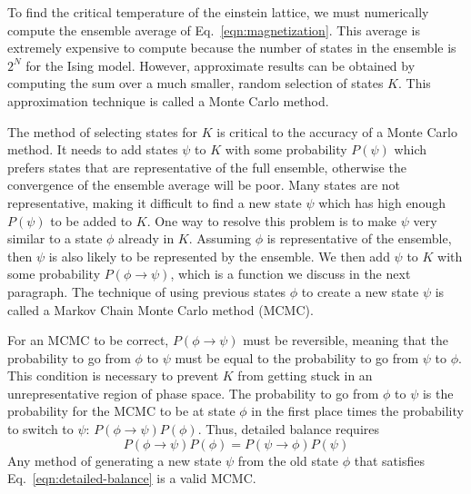 \documentclass[amsmath,amssymb,aps,twocolumn,nofootinbib]{revtex4-2}
\begin{document}
To find the critical temperature of the einstein lattice, we must numerically compute the ensemble average of Eq.~\ref{eqn:magnetization}. This average is extremely expensive to compute because the number of states in the ensemble is $2^N$ for the Ising model. However, approximate results can be obtained by computing the sum over a much smaller, random selection of states $K$. This approximation technique is called a Monte Carlo method.

The method of selecting states for $K$ is critical to the accuracy of a Monte Carlo method. It needs to add states $\psi$ to $K$ with some probability $P(\psi)$ which prefers states that are representative of the full ensemble, otherwise the convergence of the ensemble average will be poor. Many states are not representative, making it difficult to find a new state $\psi$ which has high enough $P(\psi)$ to be added to $K$. One way to resolve this problem is to make $\psi$ very similar to a state $\phi$ already in $K$. Assuming $\phi$ is representative of the ensemble, then $\psi$ is also likely to be represented by the ensemble. We then add $\psi$ to $K$ with some probability $P(\phi \rightarrow \psi)$, which is a function we discuss in the next paragraph. The technique of using previous states $\phi$ to create a new state $\psi$ is called a Markov Chain Monte Carlo method (MCMC).

For an MCMC to be correct, $P(\phi \rightarrow \psi)$ must be reversible, meaning that the probability to go from $\phi$ to $\psi$ must be equal to the probability to go from $\psi$ to $\phi$. This condition is necessary to prevent $K$ from getting stuck in an unrepresentative region of phase space. The probability to go from $\phi$ to $\psi$ is the probability for the MCMC to be at state $\phi$ in the first place times the probability to switch to $\psi$: $P(\phi \rightarrow \psi)P(\phi)$. Thus, detailed balance requires
\begin{equation}
  P(\phi \rightarrow \psi)P(\phi) = P(\psi \rightarrow \phi)P(\psi)
  \label{eqn:detailed-balance}
\end{equation}
Any method of generating a new state $\psi$ from the old state $\phi$ that satisfies Eq.~\ref{eqn:detailed-balance} is a valid MCMC.
\end{document}
